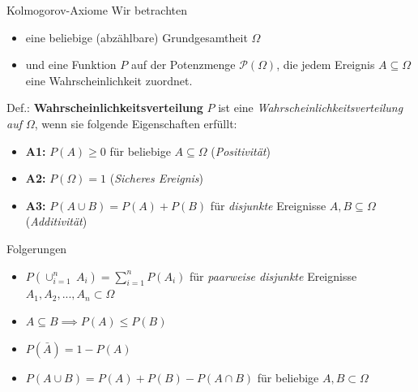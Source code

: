 \documentclass[
  10pt,
  ignorenonframetext,
]{beamer}
\providecommand{\tightlist}{%
  \setlength{\itemsep}{0pt}\setlength{\parskip}{0pt}}
\begin{document}
\begin{frame}{Kolmogorov-Axiome}
\label{kolmogorov-axiome}
Wir betrachten

\begin{itemize}
\tightlist
\item
  eine beliebige (abzählbare) Grundgesamtheit \(\Omega\)
\item
  und eine Funktion \(P\) auf der Potenzmenge \({\mathcal P}(\Omega)\),
  die jedem Ereignis \(A \subseteq \Omega\) eine Wahrscheinlichkeit
  zuordnet.
\end{itemize}

\begin{block}{Def.: \textbf{Wahrscheinlichkeitsverteilung}}
\label{def.-wahrscheinlichkeitsverteilung}
\(P\) ist eine \emph{Wahrscheinlichkeitsverteilung auf \(\Omega\)}, wenn
sie folgende Eigenschaften erfüllt:

\begin{itemize}
\tightlist
\item
  \textbf{A1:} \(P(A)\geq 0\) \quad für beliebige \(A \subseteq \Omega\)
  (\emph{Positivität})\\
\item
  \textbf{A2:} \(P(\Omega) = 1\) (\emph{Sicheres Ereignis})\\
\item
  \textbf{A3:} \(P(A \cup B) = P(A) + P(B)\) für \emph{disjunkte}
  Ereignisse \(A,B \subseteq \Omega\) (\emph{Additivität})
\end{itemize}
\end{block}
\end{frame}

\begin{frame}{Folgerungen}
\label{folgerungen}
\begin{itemize}
\tightlist
\item
  \(P(\cup_{i=1}^n\: A_i) = \sum\limits_{i=1}^n P(A_i)\) für
  \emph{paarweise disjunkte} Ereignisse
  \(A_1, A_2, ..., A_n \subset \Omega\)
\item
  \(A \subseteq B \implies P(A) \leq P(B)\)
\item
  \(P(\bar{A}) = 1 - P(A)\)
\item
  \(P(A \cup B) = P(A) + P(B) - P(A \cap B)\) für beliebige
  \(A, B \subset \Omega\)
\end{itemize}

\end{frame}
\end{document}
